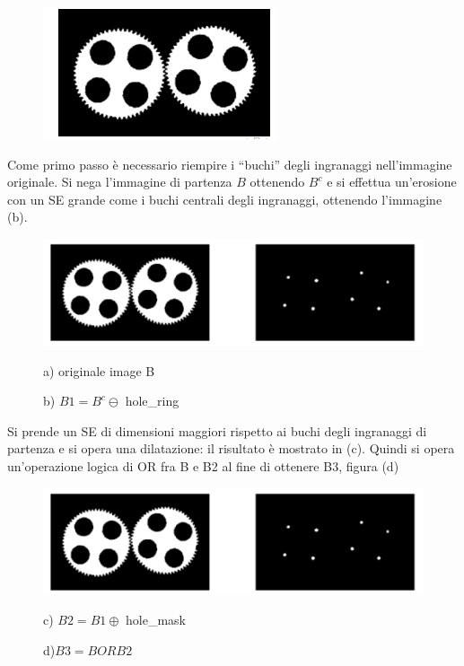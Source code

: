 \begin{figure}[H]
    \centering
    \includegraphics[width=\linewidth, keepaspectratio]{capitoli/immagini/imgs/orologi-esempio.png}
\end{figure}

Come primo passo è necessario riempire i “buchi” degli ingranaggi nell'immagine originale.
Si nega l'immagine di partenza $B$ ottenendo $B^c$ e si effettua un'erosione con un SE grande come i buchi centrali degli ingranaggi, ottenendo l'immagine (b).

\begin{figure}[H]
    \centering
    \includegraphics[width=\linewidth, keepaspectratio]{capitoli/immagini/imgs/orologi2.png}
    \caption*{a) originale image B}
    \caption*{b) $B1=B^c \ominus$ hole\_ring}
\end{figure}

Si prende un SE di dimensioni maggiori rispetto ai buchi degli ingranaggi di partenza e si opera una dilatazione: il risultato è
mostrato in (c). Quindi si opera un'operazione logica di OR fra B e B2 al fine di ottenere B3, figura (d)

\begin{figure}[H]
    \centering
    \includegraphics[width=\linewidth, keepaspectratio]{capitoli/immagini/imgs/orologi3.png}
    \caption*{c) $B2 = B1 \oplus$ hole\_mask}
    \caption*{d)$B3 = B OR B2$}
\end{figure}

